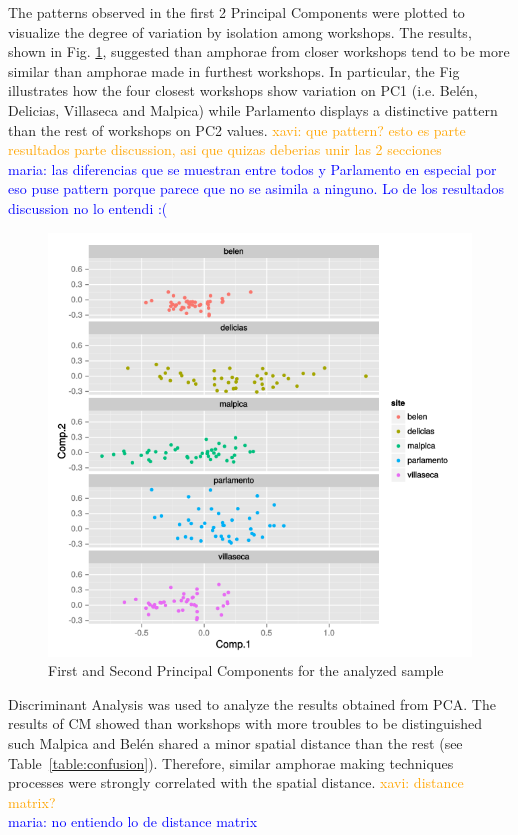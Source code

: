 \documentclass[review]{elsarticle}
\newcommand{\memo}[2]{\textcolor{#1}{#2}}
\newcommand{\xavi}[1]{\memo{orange}{xavi: #1\\}}
\newcommand{\maria}[1]{\memo{blue}{maria: #1\\}}
\begin{document}
    

The patterns observed in the first 2 Principal Components were plotted to visualize the degree of variation by isolation among workshops. The results, shown in Fig. \ref{pca}, suggested than amphorae from closer workshops tend to be more similar than amphorae made in furthest workshops. In particular, the Fig illustrates how the four closest workshops show variation on PC1 (i.e. Bel\'en, Delicias, Villaseca and Malpica) while Parlamento displays a distinctive pattern than the rest of workshops on PC2 values. 
\xavi{que pattern? esto es parte resultados parte discussion, asi que quizas deberias unir las 2 secciones}
\maria{las diferencias que se muestran entre todos y Parlamento en especial por eso puse pattern porque parece que no se asimila a ninguno. Lo de los resultados discussion no lo entendi :(}


\begin{figure}[htp]
	\centering
\includegraphics[scale=0.45]{pca.png}
\caption{First and Second Principal Components for the analyzed sample}
\label{pca}
\end{figure} 



Discriminant Analysis was used to analyze the results obtained from PCA. The results of CM showed than workshops with more troubles to be distinguished such Malpica and Bel\'en shared a minor spatial distance than the rest (see Table~\ref{table:confusion}). Therefore, similar amphorae making techniques processes were strongly correlated with the spatial distance. 
\xavi{distance matrix?} \maria{no entiendo lo de distance matrix}
\end{document}
